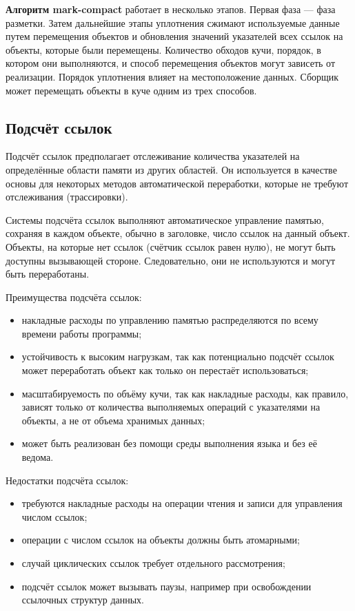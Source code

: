 \textbf{Алгоритм mark-compact} работает в несколько этапов. Первая фаза --- фаза разметки. Затем дальнейшие
этапы уплотнения сжимают используемые данные путем перемещения объектов и обновления значений указателей всех ссылок на объекты, которые были перемещены. Количество обходов кучи, порядок, в котором они выполняются, и способ перемещения объектов могут зависеть от реализации. Порядок уплотнения влияет на местоположение данных. Сборщик может перемещать объекты в куче одним из трех способов.~\cite{handbook}




\subsection{Подсчёт ссылок}

Подсчёт ссылок предполагает отслеживание количества указателей на определённые области памяти из других областей. Он используется в качестве основы для некоторых методов автоматической переработки, которые не требуют отслеживания (трассировки).~\cite{recycling}

Системы подсчёта ссылок выполняют автоматическое управление памятью, сохраняя в каждом объекте, обычно в заголовке, число ссылок на данный объект. Объекты, на которые нет ссылок (счётчик ссылок равен нулю), не могут быть доступны вызывающей стороне. Следовательно, они не используются и могут быть переработаны.~\cite{glossary}

Преимущества подсчёта ссылок:

\begin{itemize}[label*=---]
	\item накладные расходы по управлению памятью распределяются по всему времени работы программы;~\cite{handbook}
	\item устойчивость к высоким нагрузкам, так как потенциально подсчёт ссылок может переработать объект как только он перестаёт использоваться;~\cite{handbook}
	\item масштабируемость по объёму кучи, так как накладные расходы, как правило, зависят только от количества выполняемых операций с указателями на объекты, а не от объема хранимых данных;~\cite{handbook}
	\item может быть реализован без помощи среды выполнения языка и без её ведома.~\cite{handbook}
\end{itemize}

Недостатки подсчёта ссылок:

\begin{itemize}[label*=---]
	\item требуются накладные расходы на операции чтения и записи для управления числом ссылок;
	\item операции с числом ссылок на объекты должны быть атомарными;~\cite{handbook}
	\item случай циклических ссылок требует отдельного рассмотрения;~\cite{handbook}
	\item подсчёт ссылок может вызывать паузы, например при освобождении ссылочных структур данных.~\cite{handbook}
\end{itemize}

